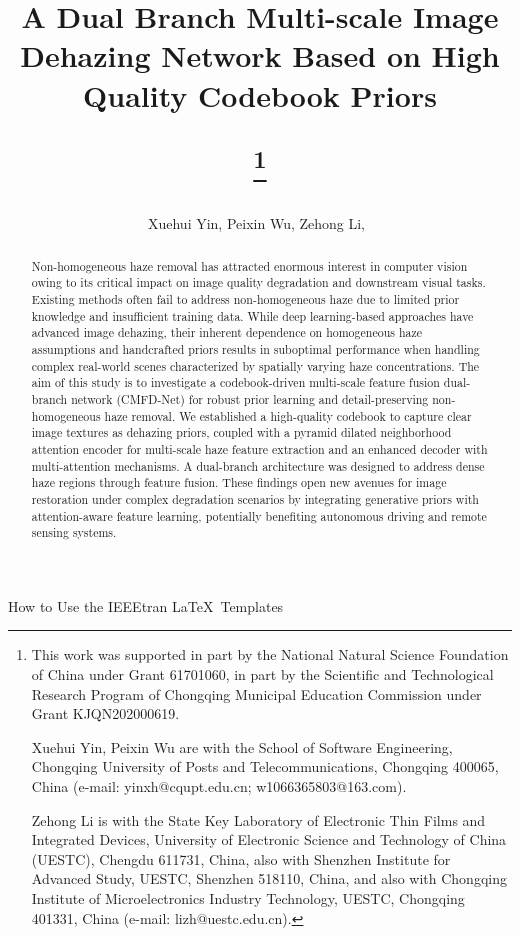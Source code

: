 \documentclass[journal]{IEEEtran}
\begin{document}
\title{A Dual Branch Multi-scale Image Dehazing Network Based on High Quality Codebook Priors
	\author{Xuehui Yin, Peixin Wu, Zehong Li,~}
	\thanks{This work was supported in part by the National Natural Science Foundation of China under Grant 61701060, in part by the Scientific and Technological Research Program of Chongqing Municipal Education Commission under Grant KJQN202000619.

		Xuehui Yin, Peixin Wu are with the School of Software Engineering, Chongqing University of Posts and Telecommunications, Chongqing 400065, China (e-mail: yinxh@cqupt.edu.cn; w1066365803@163.com).

		Zehong Li is with the State Key Laboratory of Electronic Thin Films and Integrated Devices, University of Electronic Science and Technology of China (UESTC), Chengdu 611731, China, also with Shenzhen Institute for Advanced Study, UESTC, Shenzhen 518110, China, and also with Chongqing Institute of Microelectronics Industry Technology, UESTC, Chongqing 401331, China (e-mail: lizh@uestc.edu.cn).
	}}

%
{How to Use the IEEEtran \LaTeX \ Templates}

\maketitle

\begin{abstract}
	Non-homogeneous haze removal has attracted enormous interest in computer vision owing to its critical impact on image quality degradation and downstream visual tasks. Existing methods often fail to address non-homogeneous haze due to limited prior knowledge and insufficient training data. While deep learning-based approaches have advanced image dehazing, their inherent dependence on homogeneous haze assumptions and handcrafted priors results in suboptimal performance when handling complex real-world scenes characterized by spatially varying haze concentrations. The aim of this study is to investigate a codebook-driven multi-scale feature fusion dual-branch network (CMFD-Net) for robust prior learning and detail-preserving non-homogeneous haze removal. We established a high-quality codebook to capture clear image textures as dehazing priors, coupled with a pyramid dilated neighborhood attention encoder for multi-scale haze feature extraction and an enhanced decoder with multi-attention mechanisms. A dual-branch architecture was designed to address dense haze regions through feature fusion. These findings open new avenues for image restoration under complex degradation scenarios by integrating generative priors with attention-aware feature learning, potentially benefiting autonomous driving and remote sensing systems.
\end{abstract}
\end{document}
